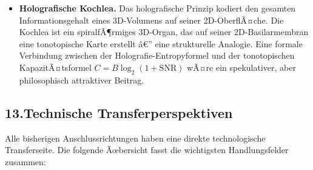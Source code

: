 ﻿\documentclass[12pt,a4paper,titlepage]{report}
\begin{document}
\begin{itemize}[leftmargin=2em]
    Die Kochlea operiert bei KÃ¶rpertemperatur ($37Â°C$),
    also in einem Umfeld, das QuantenkohÃ¤renz normalerweise
    sehr schnell dephasiert ($\tau_{\rm kohÃ¤renz} \lesssim 10^{-13}\,\mathrm{s}$).
    Dennoch hat jÃ¼ngste Forschung (Fleming et al., 2007;
    Engel et al., 2007 zu Photorezeptoren)
    gezeigt, dass QuantenkohÃ¤renz in biologischen Systemen
    bei Raumtemperatur messbar ist.
    KÃ¶nnten Haarzell-TransduktionskanÃ¤le quantenmechanische
    Effekte nutzen, um ihre Empfindlichkeit unter die klassische
    thermodynamische Rauschgrenze zu senken?
    Derzeit ist dies hochspekulativ, aber theoretisch nicht ausgeschlossen.
  \item \textbf{Holografische Kochlea.}
    Das holografische Prinzip kodiert den gesamten Informationsgehalt
    eines 3D-Volumens auf seiner 2D-OberflÃ¤che.
    Die Kochlea ist ein spiralfÃ¶rmiges 3D-Organ,
    das auf seiner 2D-Basilarmembran eine tonotopische Karte erstellt â€”
    eine strukturelle Analogie.
    Eine formale Verbindung zwischen der Holografie-Entropyformel
    und der tonotopischen KapazitÃ¤tsformel
    $C = B \log_2(1 + \mathrm{SNR})$ wÃ¤re ein spekulativer, aber
    philosophisch attraktiver Beitrag.
\end{itemize}

\subsection*{13.\enspace Technische Transferperspektiven}

Alle bisherigen Anschlussrichtungen haben eine direkte
technologische Transferseite.
Die folgende Ãœbersicht fasst die wichtigsten
Handlungsfelder zusammen:
\end{document}
